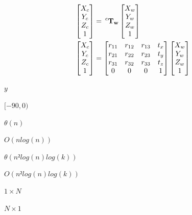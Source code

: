 \documentclass{article}
\begin{document}
\[  \begin{align*}
  \begin{bmatrix}
  X_c \\
  Y_c \\
  Z_c \\
  1
  \end{bmatrix} &=
  \hspace{0.2em} ^{c}\bf{T}_w
  \begin{bmatrix}
  X_{w} \\
  Y_{w} \\
  Z_{w} \\
  1
  \end{bmatrix} \\
  \begin{bmatrix}
  X_c \\
  Y_c \\
  Z_c \\
  1
  \end{bmatrix} &=
  \begin{bmatrix}
  r_{11} & r_{12} & r_{13} & t_x \\
  r_{21} & r_{22} & r_{23} & t_y \\
  r_{31} & r_{32} & r_{33} & t_z \\
  0 & 0 & 0 & 1
  \end{bmatrix}
  \begin{bmatrix}
  X_{w} \\
  Y_{w} \\
  Z_{w} \\
  1
  \end{bmatrix}
  \end{align*}
\]
\pagebreak

$y$
\pagebreak

$[-90, 0)$
\pagebreak

$\theta(n)$
\pagebreak

$O(n log(n))$
\pagebreak

$\theta(n²log(n)log(k))$
\pagebreak

$O(n²log(n)log(k))$
\pagebreak

$1 \times N$
\pagebreak

$N \times 1$
\pagebreak
\end{document}
